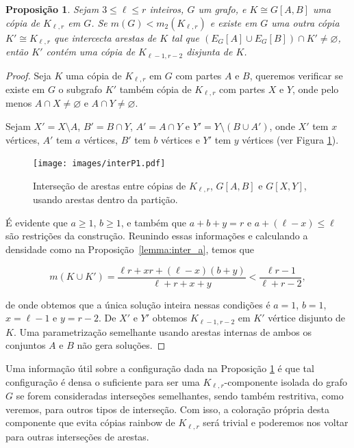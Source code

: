 \documentclass[12pt,a4paper]{book}
\newcommand{\K}{K_{\ell,r}} %
\newtheorem{proposicao} [teorema] {Proposição}
\begin{document}
    \begin{proposicao}\label{aff:casoP1}
       Sejam $3\leq \ell \leq r$ inteiros, 
      $G$ um grafo, e $K \cong G[A, B]$ uma cópia de $\K$ em $G$.
      Se $m(G) < m_2(\K)$ e existe em $G$ uma outra cópia
        $K' \cong \K $ que intercecta arestas de $K$ tal que 
        $(E_G[A] \cup E_G[B]) \cap K' \neq \varnothing$, 
        então $K'$ contém uma cópia de $K_{\ell-1,r-2}$ disjunta de $K$.
    \end{proposicao}
     \begin{proof}
         Seja $K$ uma cópia de $\K$ em $G$ com partes $A$ e $B$, queremos verificar se existe em $G$ o subgrafo $K'$ também cópia de $\K$ com partes $X$ e $Y$, onde pelo menos $A \cap X \neq \varnothing$ e $A \cap Y \neq \varnothing$.
         
         Sejam $X' = X\setminus A$,  $B' = B\cap Y$, $A' = A \cap Y$ e $Y' = Y \setminus (B\cup A')$, 
         onde
         $X'$ tem $x$ vértices, $A'$ tem $a$ vértices, $B'$ tem $b$ vértices e $Y'$ tem $y$ vértices (ver Figura \ref{fig:interP1}).


  \begin{figure}[htb] \centering \texttt{[image: images/interP1.pdf]}
   \caption{Interseção de arestas entre cópias de $\K$, $G[A,B]$ e $G[X,Y]$, usando arestas dentro da partição.}
   \label{fig:interP1}
 \end{figure}
         
         É evidente que $a \geq 1$, $b \geq 1$, e também que $a + b+y = r$ e $a + (\ell-x) \leq \ell$ são restrições da construção. 
         Reunindo essas informações e calculando a densidade como na Proposição~\ref{lemma:inter_a}, temos que 
         
         \[
            m(K \cup K') = \frac{\ell r + xr + (\ell-x)(b+y)}{\ell+r+x+y}
            < \frac{\ell r - 1}{\ell+r-2},
         \]
         
         de onde obtemos que a única solução inteira nessas condições é  $a=1$, $b=1$, $x = \ell-1$ e $y=r-2$. 
         De $X'$ e $Y'$ obtemos $K_{\ell-1, r-2}$ em $K'$ vértice disjunto de $K$.
         Uma parametrização semelhante usando arestas internas de ambos os conjuntos $A$ e $B$ não gera soluções.       
     \end{proof}
     
     Uma informação útil sobre a configuração dada na Proposição \ref{aff:casoP1} 
     é que tal configuração é densa o suficiente para ser uma $\K$-componente isolada do grafo $G$ se forem consideradas interseções semelhantes, sendo também restritiva, como veremos, para outros tipos de interseção. 
     Com isso, a coloração própria desta componente que evita cópias rainbow de $\K$ será trivial e poderemos nos voltar para outras interseções de arestas.
     
\end{document}

